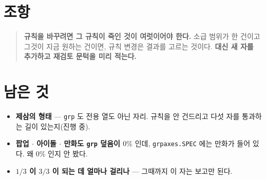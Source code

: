 \documentclass[11pt]{article}
\begin{document}
\section*{조항}

\begin{quote}
\textbf{규칙을 바꾸려면 그 규칙이 죽인 것이 여럿이어야 한다.} 소급 범위가
한 건이고 그것이 지금 원하는 건이면, 규칙 변경은 결과를 고르는 것이다.
\textbf{대신 새 자를 추가하고 재검토 문턱을 미리 적는다.}
\end{quote}

\section*{남은 것}

\begin{itemize}
\item \textbf{제삼의 형태} --- \texttt{grp} 도 전용 열도 아닌 자리. 규칙을
안 건드리고 다섯 자를 통과하는 길이 있는지(진행 중).
\item \textbf{팝업 $\cdot$ 아이돌 $\cdot$ 만화도 \texttt{grp} 덮음이 $0\%$}
인데, \texttt{grpaxes.SPEC} 에는 만화가 들어 있다. 왜 $0\%$ 인지 안 봤다.
\item \textbf{$1/3$ 이 $3/3$ 이 되는 데 얼마나 걸리나} --- 그때까지 이 자는
보고만 된다.
\end{itemize}
\end{document}
